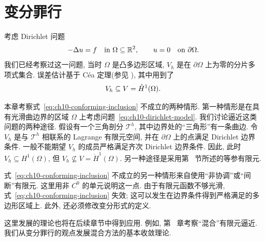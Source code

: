 \section{变分罪行}
\label{chap:ch10-variational-crimes}
\setcounter{subsection}{0}

考虑 Dirichlet 问题
\begin{equation}
\MathBookFormulaID{formula-ch10-dirichlet-model}
\label{eq:ch10-dirichlet-model}
-\Delta u=f\quad\text{in }\Omega\subseteq\mathbb R^2,
\qquad
u=0\quad\text{on }\partial\Omega.
\end{equation}
我们已经考察过这一问题, 当时 $\Omega$ 是凸多边形区域, $V_h$ 是在 $\partial\Omega$ 上为零的分片多项式集合. 误差估计基于 Céa 定理(参见 ), 其中用到了
\begin{equation}
\MathBookFormulaID{formula-ch10-conforming-inclusion}
\label{eq:ch10-conforming-inclusion}
V_h\subseteq V=\mathring H^1(\Omega).
\end{equation}

本章考察式~\eqref{eq:ch10-conforming-inclusion} 不成立的两种情形. 第一种情形是在具有光滑曲边界的区域 $\Omega$ 上考虑问题~\eqref{eq:ch10-dirichlet-model}. 我们讨论逼近这类问题的两种途径. 假设有一个三角剖分 $\mathcal T^h$, 其中边界处的``三角形''有一条曲边. 令 $V_h$ 是与 $\mathcal T^h$ 相联系的 Lagrange 有限元空间, 并在 $\partial\Omega$ 上的点满足 Dirichlet 边界条件. 一般不能期望 $V_h$ 的成员严格满足齐次 Dirichlet 边界条件. 因此, 此时 $V_h\subseteq H^1(\Omega)$, 但 $V_h\not\subseteq V=\mathring H^1(\Omega)$. 另一种途径是采用第~ 节所述的等参有限元.

式~\eqref{eq:ch10-conforming-inclusion} 不成立的另一种情形来自使用``非协调''或``间断''有限元. 这里用非 $C^0$ 的单元说明这一点. 由于有限元函数不够光滑, 式~\eqref{eq:ch10-conforming-inclusion} 失效; 这可以发生在边界条件得到严格满足的多边形区域上. 此外, 还必须修改变分形式的定义.

这里发展的理论也将在后续章节中得到应用. 例如, 第~ 章考察``混合''有限元逼近. 我们从变分罪行的观点发展混合方法的基本收敛理论.








